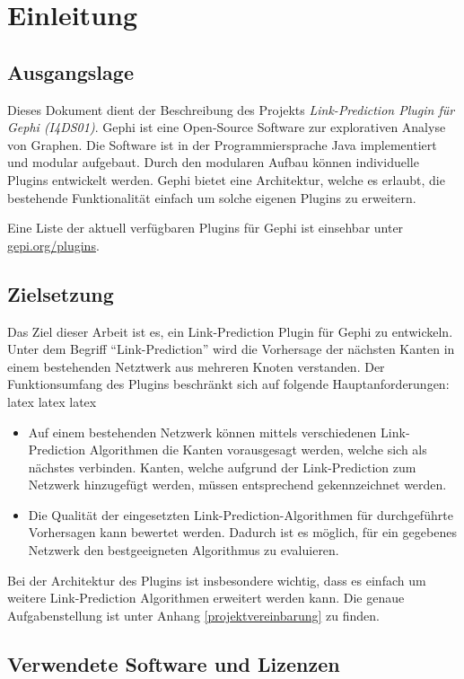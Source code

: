 \chapter{Einleitung}
\section{Ausgangslage}
Dieses Dokument dient der Beschreibung des Projekts \textit{Link-Prediction Plugin für Gephi (I4DS01)}.
Gephi ist eine Open-Source Software zur explorativen Analyse von Graphen. Die Software ist in der Programmiersprache Java implementiert und modular aufgebaut. Durch den modularen Aufbau können individuelle Plugins entwickelt werden. Gephi bietet eine Architektur, welche es erlaubt, die bestehende Funktionalität einfach um solche eigenen Plugins zu erweitern.

Eine Liste der aktuell verfügbaren Plugins für Gephi ist einsehbar unter \href{https://gephi.org/plugins}{gepi.org/plugins}.

\section{Zielsetzung}
Das Ziel dieser Arbeit ist es, ein Link-Prediction Plugin für Gephi zu entwickeln. Unter dem Begriff ``Link-Prediction'' wird die Vorhersage der nächsten Kanten in einem bestehenden Netztwerk aus mehreren Knoten verstanden.
Der Funktionsumfang des Plugins beschränkt sich auf folgende Hauptanforderungen:
\Gls{latex}
\Gls{latex}
\gls{latex}

\begin{itemize}
    \item Auf einem bestehenden Netzwerk können mittels verschiedenen Link-Prediction Algorithmen die Kanten vorausgesagt werden, welche sich als nächstes verbinden. Kanten, welche aufgrund der Link-Prediction zum Netzwerk hinzugefügt werden, müssen entsprechend gekennzeichnet werden.
    \item Die Qualität der eingesetzten Link-Prediction-Algorithmen für durchgeführte Vorhersagen kann bewertet werden. Dadurch ist es möglich, für ein gegebenes Netzwerk den bestgeeigneten Algorithmus zu evaluieren.
\end{itemize}

Bei der Architektur des Plugins ist insbesondere wichtig, dass es einfach um weitere Link-Prediction Algorithmen erweitert werden kann.
Die genaue Aufgabenstellung ist unter Anhang \ref{projektvereinbarung} zu finden.

\section{Verwendete Software und Lizenzen}

